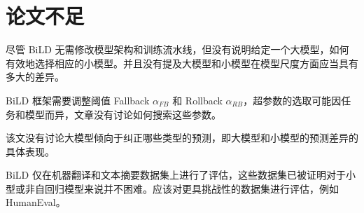 \chapter{论文不足}

尽管 BiLD 无需修改模型架构和训练流水线，但没有说明给定一个大模型，如何有效地选择相应的小模型。并且没有提及大模型和小模型在模型尺度方面应当具有多大的差异。

BiLD 框架需要调整阈值 Fallback $\alpha_{FB}$ 和 Rollback $\alpha_{RB}$，超参数的选取可能因任务和模型而异，文章没有讨论如何搜索这些参数。

该文没有讨论大模型倾向于纠正哪些类型的预测，即大模型和小模型的预测差异的具体表现。

BiLD 仅在机器翻译和文本摘要数据集上进行了评估，这些数据集已被证明对于小型或非自回归模型来说并不困难。应该对更具挑战性的数据集进行评估，例如 HumanEval。
